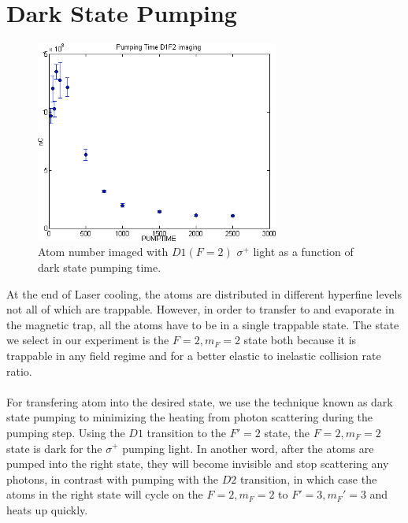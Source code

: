 \section{Dark State Pumping}\label{exp:pump}
\begin{figure}
  \begin{center}
    \includegraphics[width=8cm]{mf-pump.png}
  \end{center}
  \caption{Atom number imaged with $D1 (F=2)$ $\sigma^+$ light as a function of dark state pumping time.}
  \label{exp:mf-pump-time}
\end{figure}
At the end of Laser cooling, the atoms are distributed in different hyperfine levels not all of which are trappable. However, in order to transfer to and evaporate in the magnetic trap, all the atoms have to be in a single trappable state. The state we select in our experiment is the $F=2, m_F=2$ state both because it is trappable in any field regime and for a better elastic to inelastic collision rate ratio.\\
\\
For transfering atom into the desired state, we use the technique known as dark state pumping to minimizing the heating from photon scattering during the pumping step. Using the $D1$ transition to the $F'=2$ state, the $F=2, m_F=2$ state is dark for the $\sigma^+$ pumping light. In another word, after the atoms are pumped into the right state, they will become invisible and stop scattering any photons, in contrast with pumping with the $D2$ transition, in which case the atoms in the right state will cycle on the $F=2, m_F=2$ to $F'=3, m_F'=3$ and heats up quickly.\\
\\
